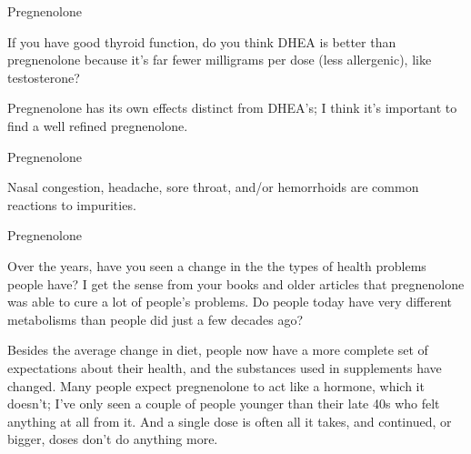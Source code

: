 \documentclass[11pt,oneside,openany,extrafontsizes]{memoir}
\begin{document}
\begin{qaexchange}{Pregnenolone}

    \begin{question}
        If you have good thyroid function, do you think DHEA is better than pregnenolone because it's far fewer milligrams per dose (less allergenic), like testosterone?
    \end{question}

    \begin{answer}
        Pregnenolone has its own effects distinct from DHEA's; I think it's important to find a well refined pregnenolone.
    \end{answer}
\end{qaexchange}

\begin{standalonequote}{Pregnenolone}

    \begin{answer}
      Nasal congestion, headache, sore throat, and/or hemorrhoids are common reactions to impurities.
    \end{answer}
\end{standalonequote}

\begin{qaexchange}{Pregnenolone}

    \begin{question}
        Over the years, have you seen a change in the the types of health problems people have? I get the sense from your books and older articles that pregnenolone was able to cure a lot of people's problems. Do people today have very different metabolisms than people did just a few decades ago?
    \end{question}

    \begin{answer}
      Besides the average change in diet, people now have a more complete set of expectations about their health, and the substances used in supplements have changed. Many people expect pregnenolone to act like a hormone, which it doesn't; I've only seen a couple of people younger than their late 40s who felt anything at all from it. And a single dose is often all it takes, and continued, or bigger, doses don't do anything more.
    \end{answer}
\end{qaexchange}
\end{document}

